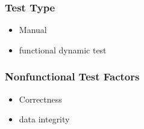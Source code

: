 \documentclass[12pt]{article}
\begin{document}
\subsubsection{Test Type}
\begin{itemize}
  \item Manual
  \item functional dynamic test
\end{itemize}
\subsubsection{Nonfunctional Test Factors}
\begin{itemize}
  \item Correctness
  \item data integrity
\end{itemize}

\end{document}
